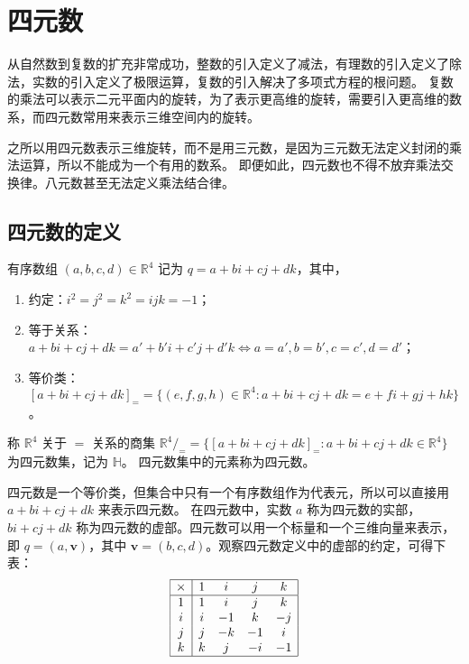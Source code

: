 \section{四元数}

从自然数到复数的扩充非常成功，整数的引入定义了减法，有理数的引入定义了除法，实数的引入定义了极限运算，复数的引入解决了多项式方程的根问题。
复数的乘法可以表示二元平面内的旋转，为了表示更高维的旋转，需要引入更高维的数系，而四元数常用来表示三维空间内的旋转。
\begin{note}
    之所以用四元数表示三维旋转，而不是用三元数，是因为三元数无法定义封闭的乘法运算，所以不能成为一个有用的数系。
    即便如此，四元数也不得不放弃乘法交换律。八元数甚至无法定义乘法结合律。
\end{note}

\vspace{1em}

\subsection{四元数的定义}
\begin{definition}
    有序数组 $(a, b, c, d)\in\mathbb{R}^4$ 记为 $q = a + bi + cj + dk$，其中，
    \begin{enumerate}
        \item 约定：$i^2 = j^2 = k^2 = ijk = -1$；
        \item 等于关系：$a + bi + cj + dk = a' + b'i + c'j + d'k \iff a = a', b = b', c = c', d = d'$；
        \item 等价类：$[a + bi + cj + dk]_{=}=\{(e,f,g,h)\in\mathbb{R}^4 : a + bi + cj + dk = e + fi + gj + hk\}$。
    \end{enumerate}
    称 $\mathbb{R}^4$ 关于 $=$ 关系的商集 $\mathbb{R}^4/_{=}= \{[a + bi + cj + dk]_{=} : a + bi + cj + dk\in\mathbb{R}^4\}$ 为四元数集，记为 $\mathbb{H}$。
    四元数集中的元素称为四元数。
\end{definition}

\begin{note}
    四元数是一个等价类，但集合中只有一个有序数组作为代表元，所以可以直接用 $a + bi + cj + dk$ 来表示四元数。
    在四元数中，实数 $a$ 称为四元数的实部，$bi + cj + dk$ 称为四元数的虚部。四元数可以用一个标量和一个三维向量来表示，
    即 $q = (a, \mathbf{v})$，其中 $\mathbf{v} = (b, c, d)$。观察四元数定义中的虚部的约定，可得下表：
    \[
        \begin{array}{|c|cccc|}
            \hline
           \times & 1 & i & j & k \\ 
           \hline
            1 & 1 & i & j & k \\ 
            i & i & -1 & k & -j \\ 
            j & j & -k & -1 & i \\ 
            k & k & j & -i & -1\\
            \hline
        \end{array}
    \]
\end{note}
\vspace{1em}

